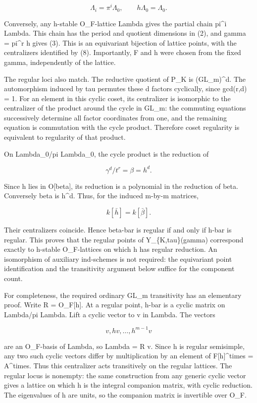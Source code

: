 \documentclass[11pt,a4paper]{article}
\begin{document}
\[
 \Lambda_i=\pi^i\Lambda_0,
 \qquad h\Lambda_0=\Lambda_0.
 \tag{10}
\]

Conversely, any h-stable O\_F-lattice Lambda gives the partial chain
pi\^{}i Lambda. This chain has the period and quotient dimensions in
(2), and gamma = pi\^{}r h gives (3). This is an equivariant bijection
of lattice points, with the centralizers identified by (8). Importantly,
F and h were chosen from the fixed gamma, independently of the lattice.

The regular loci also match. The reductive quotient of P\_K is
(GL\_m)\^{}d. The automorphism induced by tau permutes these d factors
cyclically, since gcd(r,d) = 1. For an element in this cyclic coset, its
centralizer is isomorphic to the centralizer of the product around the
cycle in GL\_m: the commuting equations successively determine all
factor coordinates from one, and the remaining equation is commutation
with the cycle product. Therefore coset regularity is equivalent to
regularity of that product.

On Lambda\_0/pi Lambda\_0, the cycle product is the reduction of

\[
 \gamma^d/t^r=\beta=h^d.
\]

Since h lies in O{[}beta{]}, its reduction is a polynomial in the
reduction of beta. Conversely beta is h\^{}d. Thus, for the induced
m-by-m matrices,

\[
 k[\bar h]=k[\bar\beta].
 \tag{11}
\]

Their centralizers coincide. Hence beta-bar is regular if and only if
h-bar is regular. This proves that the regular points of
Y\_\{K,tau\}(gamma) correspond exactly to h-stable O\_F-lattices on
which h has regular reduction. An isomorphism of auxiliary ind-schemes
is not required: the equivariant point identification and the
transitivity argument below suffice for the component count.

For completeness, the required ordinary GL\_m transitivity has an
elementary proof. Write R = O\_F{[}h{]}. At a regular point, h-bar is a
cyclic matrix on Lambda/pi Lambda. Lift a cyclic vector to v in Lambda.
The vectors

\[
 v,hv,\ldots,h^{m-1}v
\]

are an O\_F-basis of Lambda, so Lambda = R v. Since h is regular
semisimple, any two such cyclic vectors differ by multiplication by an
element of F{[}h{]}\^{}times = A\^{}times. Thus this centralizer acts
transitively on the regular lattices. The regular locus is nonempty: the
same construction from any generic cyclic vector gives a lattice on
which h is the integral companion matrix, with cyclic reduction. The
eigenvalues of h are units, so the companion matrix is invertible over
O\_F.
\end{document}
